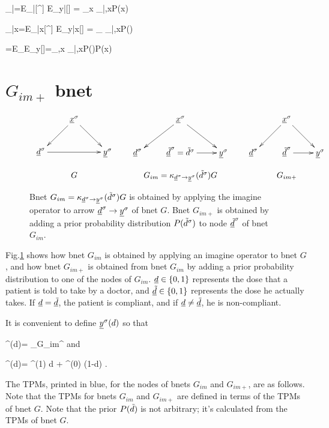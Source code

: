 \beq
\caly_{|\td}=E_{\s|\td}[\rvy^\s]
\rarrow E_{y|\td}[\rvy]
=
\sum_x \caly_{|\td,x}P(x)
\eeq

\beq
\caly_{|x}=E_{\s|x}[\rvy^\s]
\rarrow E_{y|x}[\rvy]
=
\sum_{\td} \caly_{|\td,x}P(\td)
\eeq


\beq
\caly=E_\s[\rvy^\s]
\rarrow E_y[\rvy]=\sum_{\td,x}
 \caly_{|\td,x}P(\td)P(x)
\eeq

\section{$G_{im+}$ bnet}


\begin{figure}[h!]
$$
\begin{array}{ccccc}
\xymatrix{
&\rvx^\s\ar[dl]\ar[dr]
\\
\rvd^\s\ar[rr]&&\rvy^\s
}
&&
\xymatrix{
&\rvx^\s\ar[dl]\ar[dr]
\\
\rvd^\s&\rvtd^\s=\td^\s\ar[r]&\rvy^\s
}
&&
\xymatrix{
&\rvx^\s\ar[dl]\ar[dr]
\\
\rvd^\s&\rvtd^\s\ar[r]&\rvy^\s
}
\\
\\
G&&G_{im}= \kappa_{\rvd^\s\rarrow\rvy^\s}
(\td^\s)G&&G_{im+}
\end{array}
$$
\caption{Bnet 
$G_{im}= \kappa_{{\underline{d}}^\sigma\rightarrow{\underline{y}}^\sigma}
({\tilde{d}}^\sigma)G$
is obtained by applying 
the imagine operator to arrow 
${\underline{d}}^\sigma\rightarrow{\underline{y}}^\sigma$
of bnet $G$. Bnet $ G_{im+}$
is obtained
by adding a prior
probability distribution $P({\tilde{d}}^\sigma)$
to node ${\underline{\tilde{d}}}^\sigma$ of
bnet $G_{im}$.
} 
\label{fig-po-G-im}
\end{figure}

Fig.\ref{fig-po-G-im}
shows how bnet $G_{im}$
is obtained by applying 
an imagine operator to bnet $G$,
and how bnet $G_{im+}$
is obtained from bnet 
$G_{im}$ by adding
a prior
probability distribution to
one of the nodes of $G_{im}$.
${\underline{d}}\in \{0,1\}$ represents the
dose that a patient 
is told to take by a doctor, and
${\underline{\tilde{d}}}\in \{0,1\}$ represents the 
dose he actually takes.
If ${\underline{d}}={\underline{\tilde{d}}}$, the
patient is compliant,
and if ${\underline{d}}\neq{\underline{\tilde{d}}}$, he is
non-compliant.


It is convenient to define
${\underline{y}}^\sigma(d)$ so that

\beq
\rvy^\s(d)=
\rvy_{G_{im}}^\s
\eeq
and

\beq
\rvy^\s(d)=
\rvy^\s(1) d
+
\rvy^\s(0) (1-d)
\;.
\eeq 

The TPMs, printed in blue,
for the nodes of bnets $G_{im}$ and $G_{im+}$,
are as follows.
Note that the TPMs
for bnets  $G_{im}$ and $G_{im+}$
are defined in terms
of the TPMs of bnet $G$.
Note that
the prior
$P({\tilde{d}})$ is not arbitrary;
it's calculated from
the TPMs of bnet $G$.


